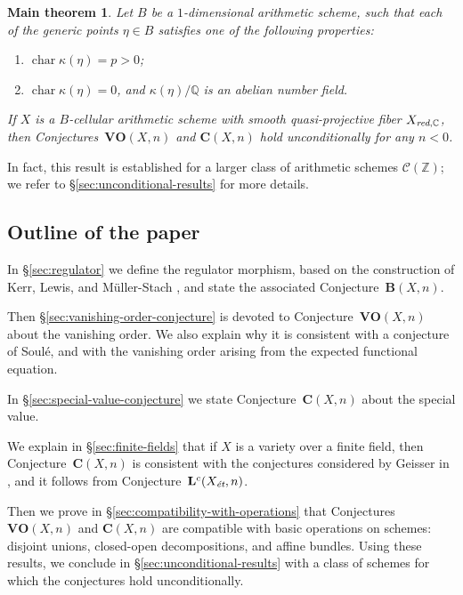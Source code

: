 \documentclass[10pt,a4paper,oneside,draft]{article}
\DeclareMathOperator{\fchar}{char}
\newcommand{\CC}{\mathbb{C}}
\newcommand{\QQ}{\mathbb{Q}}
\newcommand{\ZZ}{\mathbb{Z}}
\newcommand{\et}{\text{\it \'{e}t}}
\newcommand{\red}{\text{\it red}}
\theoremstyle{myplain}
\newtheorem*{maintheorem*}{Main theorem}
\theoremstyle{mydefinition}
\numberwithin{equation}{section}
\begin{document}
\begin{maintheorem*}
  Let $B$ be a $1$-dimensional arithmetic scheme, such that each of the generic
  points $\eta \in B$ satisfies one of the following properties:
  \begin{enumerate}
  \item[a)] $\fchar \kappa (\eta) = p > 0$;

  \item[b)] $\fchar \kappa (\eta) = 0$, and $\kappa (\eta)/\QQ$ is an abelian
    number field.
  \end{enumerate}
  If $X$ is a $B$-cellular arithmetic scheme with smooth quasi-projective fiber
  $X_{\red,\CC}$, then Conjectures~$\mathbf{VO} (X,n)$ and
  $\mathbf{C} (X,n)$ hold unconditionally for any $n < 0$.
\end{maintheorem*}

In fact, this result is established for a larger class of arithmetic schemes
$\mathcal{C} (\ZZ)$; we refer to \S\ref{sec:unconditional-results} for more
details.

\subsection*{Outline of the paper}

In \S\ref{sec:regulator} we define the regulator morphism, based on the
construction of Kerr, Lewis, and M\"{u}ller-Stach
\cite{Kerr-Lewis-Muller-Stach-2006}, and state the associated
Conjecture~$\mathbf{B} (X,n)$.

Then \S\ref{sec:vanishing-order-conjecture} is devoted to
Conjecture~$\mathbf{VO} (X,n)$ about the vanishing order. We also explain why it
is consistent with a conjecture of Soul\'{e}, and with the vanishing order
arising from the expected functional equation.

In \S\ref{sec:special-value-conjecture} we state Conjecture~$\mathbf{C} (X,n)$
about the special value.

We explain in \S\ref{sec:finite-fields} that if $X$ is a variety over a finite
field, then Conjecture~$\mathbf{C} (X,n)$ is consistent with the conjectures
considered by Geisser in
\cite{Geisser-2004,Geisser-2006,Geisser-2010-arithmetic-homology}, and it
follows from Conjecture~$\mathbf{L}^c (X_\et,n)$.

Then we prove in \S\ref{sec:compatibility-with-operations} that Conjectures
$\mathbf{VO} (X,n)$ and $\mathbf{C} (X,n)$ are compatible with basic operations
on schemes: disjoint unions, closed-open decompositions, and affine
bundles. Using these results, we conclude in \S\ref{sec:unconditional-results}
with a class of schemes for which the conjectures hold unconditionally.
\end{document}
